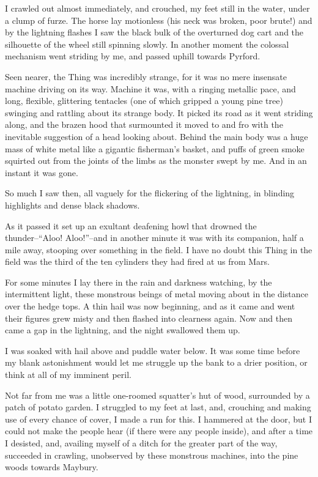 I crawled out almost immediately, and crouched, my feet still in
the water, under a clump of furze. The horse lay motionless (his
neck was broken, poor brute!) and by the lightning flashes I saw
the black bulk of the overturned dog cart and the silhouette of the
wheel still spinning slowly. In another moment the colossal
mechanism went striding by me, and passed uphill towards Pyrford.

Seen nearer, the Thing was incredibly strange, for it was no mere
insensate machine driving on its way. Machine it was, with a
ringing metallic pace, and long, flexible, glittering tentacles
(one of which gripped a young pine tree) swinging and rattling
about its strange body. It picked its road as it went striding
along, and the brazen hood that surmounted it moved to and fro with
the inevitable suggestion of a head looking about. Behind the main
body was a huge mass of white metal like a gigantic fisherman's
basket, and puffs of green smoke squirted out from the joints of
the limbs as the monster swept by me. And in an instant it was
gone.

So much I saw then, all vaguely for the flickering of the
lightning, in blinding highlights and dense black shadows.

As it passed it set up an exultant deafening howl that drowned the
thunder--``Aloo! Aloo!''--and in another minute it was with its
companion, half a mile away, stooping over something in the field.
I have no doubt this Thing in the field was the third of the ten
cylinders they had fired at us from Mars.

For some minutes I lay there in the rain and darkness watching, by
the intermittent light, these monstrous beings of metal moving
about in the distance over the hedge tops. A thin hail was now
beginning, and as it came and went their figures grew misty and
then flashed into clearness again. Now and then came a gap in the
lightning, and the night swallowed them up.

I was soaked with hail above and puddle water below. It was some
time before my blank astonishment would let me struggle up the bank
to a drier position, or think at all of my imminent peril.

Not far from me was a little one-roomed squatter's hut of wood,
surrounded by a patch of potato garden. I struggled to my feet at
last, and, crouching and making use of every chance of cover, I
made a run for this. I hammered at the door, but I could not make
the people hear (if there were any people inside), and after a time
I desisted, and, availing myself of a ditch for the greater part of
the way, succeeded in crawling, unobserved by these monstrous
machines, into the pine woods towards Maybury.

